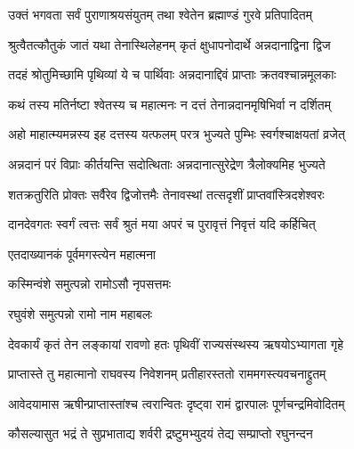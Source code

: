 


\twolineshloka
{उक्तं भगवता सर्वं पुराणाश्रयसंयुतम्}
{तथा श्वेतेन ब्रह्माण्डं गुरवे प्रतिपादितम्}%

\twolineshloka
{श्रुत्वैतत्कौतुकं जातं यथा तेनास्थिलेहनम्}
{कृतं क्षुधापनोदार्थे अन्नदानाद्विना द्विज}%

\twolineshloka
{तदहं श्रोतुमिच्छामि पृथिव्यां ये च पार्थिवाः}
{अन्नदानाद्दिवं प्राप्ताः क्रतवश्चान्नमूलकाः}%

\twolineshloka
{कथं तस्य मतिर्नष्टा श्वेतस्य च महात्मनः}
{न दत्तं तेनान्नदानमृषिभिर्वा न दर्शितम्}%

\twolineshloka
{अहो माहात्म्यमन्नस्य इह दत्तस्य यत्फलम्}
{परत्र भुज्यते पुम्भिः स्वर्गश्चाक्षयतां व्रजेत्}%

\twolineshloka
{अन्नदानं परं विप्राः कीर्तयन्ति सदोत्थिताः}
{अन्नदानात्सुरेद्रेण त्रैलोक्यमिह भुज्यते}%

\twolineshloka
{शतक्रतुरिति प्रोक्तः सर्वैरेव द्विजोत्तमैः}
{तेनावस्थां तत्सदृशीं प्राप्तवांस्त्रिदशेश्वरः}%

\twolineshloka
{दानदेवगतः स्वर्गं त्वत्तः सर्वं श्रुतं मया}
{अपरं च पुरावृत्तं निवृत्तं यदि कर्हिचित्}%



\onelineshloka
{एतदाख्यानकं पूर्वमगस्त्येन महात्मना}%



\onelineshloka
{कस्मिन्वंशे समुत्पन्नो रामोऽसौ नृपसत्तमः}%



\onelineshloka
{रघुवंशे समुत्पन्नो रामो नाम महाबलः}%

\twolineshloka
{देवकार्यं कृतं तेन लङ्कायां रावणो हतः}
{पृथिवीं राज्यसंस्थस्य ऋषयोऽभ्यागता गृहे}%

\twolineshloka
{प्राप्तास्ते तु महात्मानो राघवस्य निवेशनम्}
{प्रतीहारस्ततो राममगस्त्यवचनाद्द्रुतम्}%

\twolineshloka
{आवेदयामास ऋषीन्प्राप्तास्तांश्च त्वरान्वितः}
{दृष्ट्वा रामं द्वारपालः पूर्णचन्द्रमिवोदितम्}%

\twolineshloka
{कौसल्यासुत भद्रं ते सुप्रभाताद्य शर्वरी}
{द्रष्टुमभ्युदयं तेद्य सम्प्राप्तो रघुनन्दन}%

